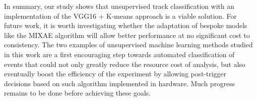 \documentclass[review,number,sort&compress]{elsarticle}
\begin{document}
In summary, our study shows that unsupervised track classification with an implementation of the VGG16 + K-means approach is a viable solution. For future work, it is worth investigating whether the adaptation of bespoke models like the MIXAE algorithm will allow better performance at no significant cost to consistency.  
The two examples of unsupervised machine learning methods studied in this work are a first encouraging step towards automated classification of events that could not only greatly reduce the resource cost of analysis, but also eventually boost the efficiency of the experiment by allowing post-trigger decisions based on such algorithm implemented in hardware. Much progress remains to be done before achieving these goals.



\end{document}
